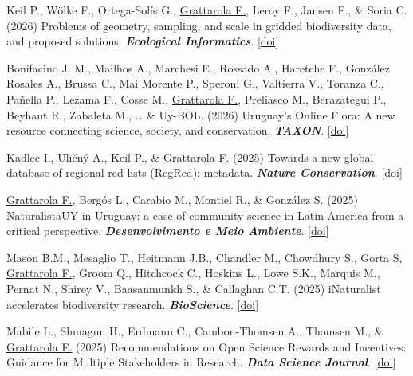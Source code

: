 \documentclass[9pt]{developercv} %
\begin{document}


\begin{etaremune}

\item Keil P., Wölke F., Ortega-Solís G., \underline{Grattarola F.}, Leroy F., Jansen F., \& Soria C. (2026) Problems of geometry, sampling, and scale in gridded biodiversity data, and proposed solutions. \textit{\textbf{Ecological Informatics}}. [\href{https://doi.org/10.1016/j.ecoinf.2026.104112}{doi}]

\item Bonifacino J. M., Mailhos A., Marchesi E., Rossado A., Haretche F., González Rosales A., Brussa C., Mai Morente P., Speroni G., Valtierra V., Toranza C., Pañella P., Lezama F., Cosse M., \underline{Grattarola F.}, Preliasco M., Berazategui P., Beyhaut R., Zabaleta M., … \& Uy-BOL. (2026) Uruguay's Online Flora: A new resource connecting science, society, and conservation. \textit{\textbf{TAXON}}. [\href{https://doi.org/10.1002/tax.70085}{doi}]

\item Kadlec I., Uličný A., Keil P., \& \underline{Grattarola F.} (2025) Towards a new global database of regional red lists (RegRed): metadata. \textit{\textbf{Nature Conservation}}. [\href{https://doi.org/10.3897/natureconservation.60.158981}{doi}]

\item \underline{Grattarola F.}, Bergós L., Carabio M., Montiel R., \& González S. (2025) NaturalistaUY in Uruguay: a case of community science in Latin America from a critical perspective. \textit{\textbf{Desenvolvimento e Meio Ambiente}}. [\href{https://doi.org/10.5380/dma.v66i.95896}{doi}]

\item Mason B.M., Mesaglio T., Heitmann J.B., Chandler M., Chowdhury S., Gorta S, \underline{Grattarola F.}, Groom Q., Hitchcock C., Hoskins L., Lowe S.K., Marquis M., Pernat N., Shirey V., Baasanmunkh S., \& Callaghan C.T. (2025) iNaturalist accelerates biodiversity research. \textit{\textbf{BioScience}}. [\href{https://doi.org/10.1093/biosci/biaf104}{doi}]

\item Mabile L., Shmagun H., Erdmann C., Cambon-Thomsen A., Thomsen M., \& \underline{Grattarola F.} (2025) Recommendations on Open Science Rewards and Incentives: Guidance for Multiple Stakeholders in Research. \textit{\textbf{Data Science Journal}}. [\href{https://doi.org/10.5334/dsj-2025-015}{doi}]


\end{etaremune}
\end{document}
